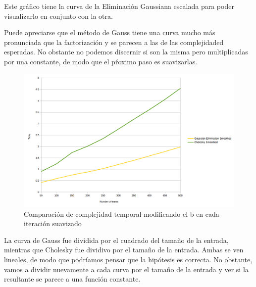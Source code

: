 Este gr\'afico tiene la curva de la Eliminaci\'on Gaussiana escalada para poder visualizarlo en conjunto con la otra.

Puede apreciarse que el m\'etodo de Gauss tiene una curva mucho m\'as pronunciada que la factorizaci\'on y se parecen a las de las complejidaded esperadas. No obstante no podemos discernir si son la misma pero multiplicadas por una constante, de modo que el p\'roximo paso es suavizarlas.

\begin{figure}[h!]
  \begin{center}
	\includegraphics[scale=0.50]{imagenes/cuantitative/bChange/ColleyMatrixCuantitativeBChangeAnalysisSmoothed.png}
	\caption{Comparaci\'on de complejidad temporal modificando el b en cada iteraci\'on suavizado}
	\label{bChangeMoreSmoothed}
  \end{center}
\end{figure}

\newpage

La curva de Gauss fue dividida por el cuadrado del tama\~no de la entrada, mientras que Cholesky fue dividivo por el tama\~no de la entrada. Ambas se ven lineales, de modo que podr\'iamos pensar que la hip\'otesis es correcta. No obstante, vamos a dividir nuevamente a cada curva por el tama\~no de la entrada y ver si la resultante se parece a una funci\'on constante.

\newpage

